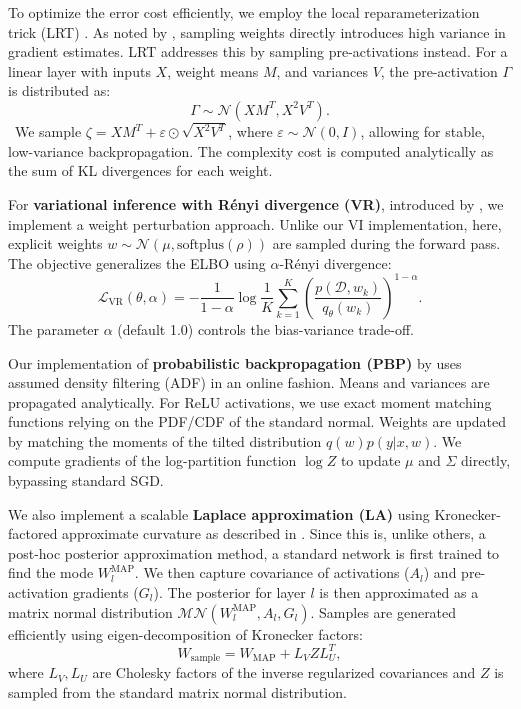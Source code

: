 \documentclass[a4paper,fleqn]{cas-dc}
\begin{document}
To optimize the error cost efficiently, we employ the local reparameterization trick (LRT) \cite{kingma2015variational}. As noted by \cite{graves2011practical}, sampling weights directly introduces high variance in gradient estimates. LRT addresses this by sampling pre-activations instead. For a linear layer with inputs \(X\), weight means \(M\), and variances \(V\), the pre-activation \(\Gamma\) is distributed as:
$$
\Gamma \sim \mathcal{N}(XM^T, X^2 V^T).
$$\
We sample \(\zeta = XM^T + \varepsilon \odot \sqrt{X^2 V^T}\), where \(\varepsilon \sim \mathcal{N}(0, I)\), allowing for stable, low-variance backpropagation. The complexity cost is computed analytically as the sum of KL divergences for each weight.

For \textbf{variational inference with Rényi divergence (VR)}, introduced by \cite{li2016renyi}, we implement a weight perturbation approach. Unlike our VI implementation, here, explicit weights \(w \sim \mathcal{N}(\mu, \text{softplus}(\rho))\) are sampled during the forward pass. The objective generalizes the ELBO using \(\alpha\)-Rényi divergence:
$$
\mathcal{L}_{\text{VR}}(\theta, \alpha) = -\frac{1}{1-\alpha} \log \frac{1}{K} \sum_{k=1}^K \left( \frac{p(\mathcal{D}, w_k)}{q_\theta(w_k)} \right)^{1-\alpha}.
$$
The parameter \(\alpha\) (default 1.0) controls the bias-variance trade-off.

Our implementation of \textbf{probabilistic backpropagation (PBP)} by \cite{hernandez2015probabilistic} uses assumed density filtering (ADF) in an online fashion. Means and variances are propagated analytically. For ReLU activations, we use exact moment matching functions relying on the PDF/CDF of the standard normal. Weights are updated by matching the moments of the tilted distribution \(q(w)p(y|x,w)\). We compute gradients of the log-partition function \(\log Z\) to update \(\mu\) and \(\Sigma\) directly, bypassing standard SGD.

We also implement a scalable \textbf{Laplace approximation (LA)} using Kronecker-factored approximate curvature as described in \cite{ritter2018scalable}. Since this is, unlike others, a post-hoc posterior approximation method, a standard network is first trained to find the mode \(W^{\text{MAP}}_l\). We then capture covariance of activations ($A_{l}$) and pre-activation gradients ($G_l$). The posterior for layer $l$ is then approximated as a matrix normal distribution \(\mathcal{MN}(W^{\text{MAP}}_l, A_l, G_l)\). Samples are generated efficiently using eigen-decomposition of Kronecker factors:
\begin{equation}
    W_{\text{sample}} = W_{\text{MAP}} + L_V Z L_U^T,
\end{equation}
where $L_V, L_U$ are Cholesky factors of the inverse regularized covariances and $Z$ is sampled from the standard matrix normal distribution.
\end{document}
